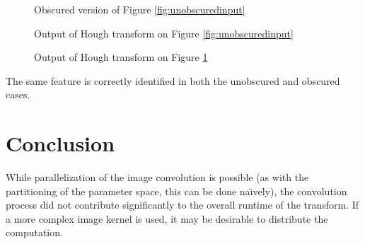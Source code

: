 \documentclass[letterpaper,12pt]{article}
\begin{document}
\begin{figure}[H]
    \caption{Obscured version of Figure \ref{fig:unobscuredinput}}
    \label{fig:obscuredinput}
\end{figure}

\begin{figure}[H]
    \caption{Output of Hough transform on Figure \ref{fig:unobscuredinput}}
    \label{fig:unobscuredoutput}
\end{figure}

\begin{figure}[H]
    \caption{Output of Hough transform on Figure \ref{fig:obscuredinput}}
    \label{fig:obscuredoutput}
\end{figure}
The same feature is correctly identified in both the unobscured and obscured cases.

\section{Conclusion}
While parallelization of the image convolution is possible (as with the partitioning of the parameter space,
this can be done na\"{\i}vely), the convolution process did not contribute significantly to the overall
runtime of the transform. If a more complex image kernel is used, it may be desirable to distribute the
computation.

\newpage

\end{document}
